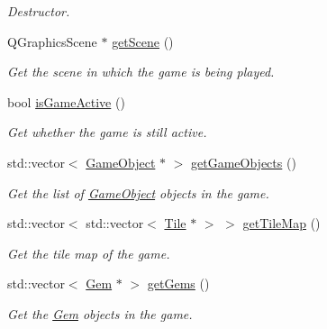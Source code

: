 \begin{DoxyCompactItemize}
\begin{DoxyCompactList}\small\item\em Destructor. \end{DoxyCompactList}\item 
Q\-Graphics\-Scene $\ast$ \hyperlink{classGameState_af38b3925bdf2592414fe6276106553bb}{get\-Scene} ()
\begin{DoxyCompactList}\small\item\em Get the scene in which the game is being played. \end{DoxyCompactList}\item 
bool \hyperlink{classGameState_aeb4c715344671e22d6512d5e8dc12ffe}{is\-Game\-Active} ()
\begin{DoxyCompactList}\small\item\em Get whether the game is still active. \end{DoxyCompactList}\item 
std\-::vector$<$ \hyperlink{classGameObject}{Game\-Object} $\ast$ $>$ \hyperlink{classGameState_a545c8d3a7f4ecb25982983d8a1dfb634}{get\-Game\-Objects} ()
\begin{DoxyCompactList}\small\item\em Get the list of \hyperlink{classGameObject}{Game\-Object} objects in the game. \end{DoxyCompactList}\item 
std\-::vector$<$ std\-::vector$<$ \hyperlink{classTile}{Tile} $\ast$ $>$ $>$ \hyperlink{classGameState_a7cd456e4a0e6990e3fc313aff87f64a4}{get\-Tile\-Map} ()
\begin{DoxyCompactList}\small\item\em Get the tile map of the game. \end{DoxyCompactList}\item 
std\-::vector$<$ \hyperlink{classGem}{Gem} $\ast$ $>$ \hyperlink{classGameState_a241704c9ce9c7104a4acad810d4433ec}{get\-Gems} ()
\begin{DoxyCompactList}\small\item\em Get the \hyperlink{classGem}{Gem} objects in the game. \end{DoxyCompactList}\end{DoxyCompactItemize}

